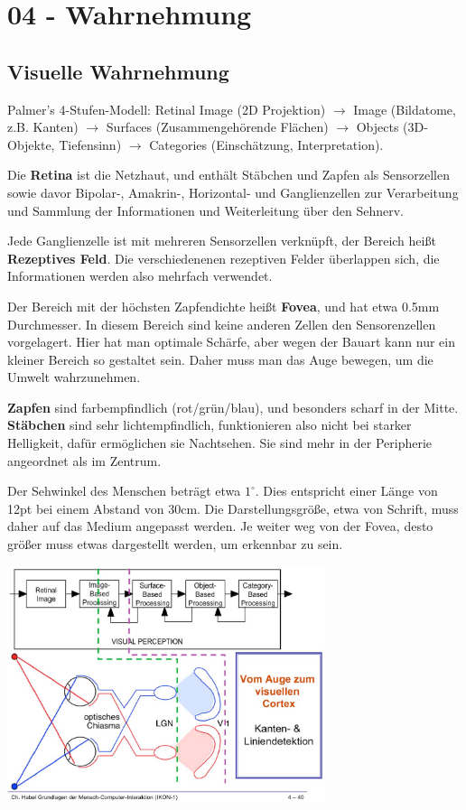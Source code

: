 \section{04 - Wahrnehmung}

\subsection{Visuelle Wahrnehmung}

Palmer's 4-Stufen-Modell: Retinal Image (2D Projektion)
$\rightarrow$ Image (Bildatome, z.B. Kanten)
$\rightarrow$ Surfaces (Zusammengehörende Flächen)
$\rightarrow$ Objects (3D-Objekte, Tiefensinn)
$\rightarrow$ Categories (Einschätzung, Interpretation).

Die \textbf{Retina} ist die Netzhaut, und enthält Stäbchen und Zapfen als Sensorzellen
sowie davor Bipolar-, Amakrin-, Horizontal- und Ganglienzellen zur Verarbeitung
und Sammlung der Informationen und Weiterleitung über den Sehnerv.

Jede Ganglienzelle ist mit mehreren Sensorzellen verknüpft, der Bereich heißt
\textbf{Rezeptives Feld}. Die verschiedenenen rezeptiven Felder überlappen sich, die
Informationen werden also mehrfach verwendet.

Der Bereich mit der höchsten Zapfendichte heißt
\textbf{Fovea}, und hat etwa 0.5mm Durchmesser. In diesem Bereich sind keine anderen
Zellen den Sensorenzellen vorgelagert. Hier hat man optimale Schärfe, aber wegen
der Bauart kann nur ein kleiner Bereich so gestaltet sein. Daher muss man das
Auge bewegen, um die Umwelt wahrzunehmen.

\textbf{Zapfen} sind farbempfindlich (rot/grün/blau), und besonders scharf in der Mitte.
\textbf{Stäbchen} sind sehr lichtempfindlich, funktionieren also nicht bei starker
Helligkeit, dafür ermöglichen sie Nachtsehen. Sie sind mehr in der Peripherie angeordnet
als im Zentrum.

Der Sehwinkel des Menschen beträgt etwa $1^\circ$. Dies entspricht einer Länge von 12pt bei
einem Abstand von 30cm. Die Darstellungsgröße, etwa von Schrift, muss daher auf das
Medium angepasst werden. Je weiter weg von der Fovea, desto größer muss etwas dargestellt
werden, um erkennbar zu sein.

\begin{center}
    \includegraphics[width=0.7\textwidth]{eye-visual-cortex.png}
\end{center}

